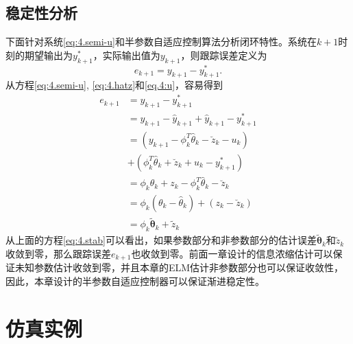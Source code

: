 \subsection{稳定性分析}\label{sect:4.3.2}
下面针对系统\ref{eq:4.semi-u}和半参数自适应控制算法分析闭环特性。系统在$k+1$时刻的期望输出为$y^{*}_{k+1}$，实际输出值为$y_{k+1}$，则跟踪误差定义为
\begin{equation}
e_{k+1} = y_{k+1} - y^{*}_{k+1}.
\end{equation}
从方程\eqref{eq:4.semi-u}, \eqref{eq:4.hatz}和\eqref{eq.4:u}，容易得到
\begin{equation}\label{eq:4.stab}
\begin{split}%
e_{k+1} & = y_{k+1} - y^{*}_{k+1}\\
& = y_{k+1} - \hat{y}_{k+1} + \hat{y}_{k+1} - y^{*}_{k+1}\\
& = (y_{k+1} - \phi_{k}^{T}\hat{\theta}_{k} - \breve{z}_{k} - u_{k} )\\
& + (\phi_{k}^{T}\hat{\theta}_{k} + \breve{z}_{k} + u_{k}  - y^{*}_{k+1})\\
& = \phi_{k}\theta_{k} + z_{k} - \phi_{k}^{T}\hat{\theta}_{k} - \breve{z}_{k}\\
& = \phi_{k}(\theta_{k} - \hat{\theta}_{k}) + (z_{k} - \breve{z}_{k})\\
& = \phi_{k}\tilde{\bm{\theta}}_{k}+\tilde{z}_{k}
\end{split}
\end{equation}
从上面的方程\eqref{eq:4.stab}可以看出，如果参数部分和非参数部分的估计误差$\tilde{\bm{\theta}}_{k}$和$\tilde{z}_{k}$收敛到零，那么跟踪误差$e_{k+1}$也收敛到零。前面一章设计的信息浓缩估计可以保证未知参数估计收敛到零，并且本章的ELM估计非参数部分也可以保证收敛性，因此，本章设计的半参数自适应控制器可以保证渐进稳定性。

\section{仿真实例}\label{sect:4.4}

